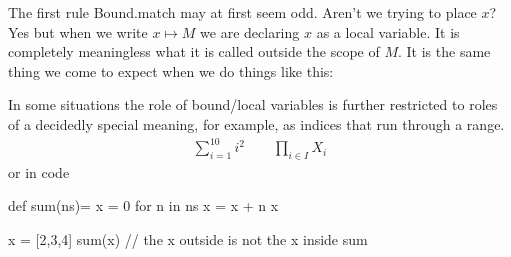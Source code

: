 The first rule Bound.match may at first seem odd.  Aren't we trying to place $x$?
Yes but when we write $x\mapsto M$ we are declaring $x$ as a local variable.  
It is completely meaningless what it is called outside the scope of $M$.
It is the same thing we come to expect when we do things like this:


In some situations the role of bound/local variables is further 
restricted to roles of a decidedly special meaning, for example, as indices that 
run through a range.
\begin{align*}
    \sum_{i=1}^{10} i^2 \qquad \prod_{i\in I}X_i 
\end{align*}
or in code 
\begin{center}
\begin{Pcode}[]
def sum(ns)= {
  x = 0
  for n in ns 
    x = x + n
  x  
}

x = [2,3,4]
sum(x)  // the x outside is not the x inside sum
\end{Pcode}
\end{center}